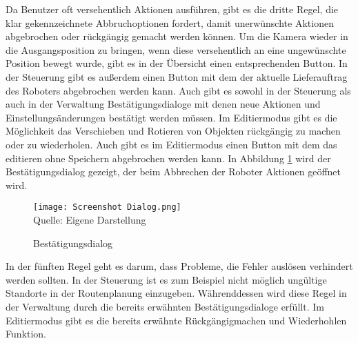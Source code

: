 Da Benutzer oft versehentlich Aktionen ausführen, gibt es die dritte Regel, die klar gekennzeichnete Abbruchoptionen fordert, damit unerwünschte Aktionen abgebrochen oder rückgängig gemacht werden können. Um die Kamera wieder in die Ausgangsposition zu bringen, wenn diese versehentlich an eine ungewünschte Position bewegt wurde, gibt es in der Übersicht einen entsprechenden Button. In der Steuerung gibt es außerdem einen Button mit dem der aktuelle Lieferauftrag des Roboters abgebrochen werden kann. Auch gibt es sowohl in der Steuerung als auch in der Verwaltung Bestätigungsdialoge mit denen neue Aktionen und Einstellungsänderungen bestätigt werden müssen. Im Editiermodus gibt es die Möglichkeit das Verschieben und Rotieren von Objekten rückgängig zu machen oder zu wiederholen. Auch gibt es im Editiermodus einen Button mit dem das editieren ohne Speichern abgebrochen werden kann. In Abbildung \ref{fig:DialogScreenshot} wird der Bestätigungsdialog gezeigt, der beim Abbrechen der Roboter Aktionen geöffnet wird.

\begin{figure}[H]
    \caption{Bestätigungsdialog}\label{fig:DialogScreenshot}
    \texttt{[image: Screenshot Dialog.png]}
    \\
    Quelle: Eigene Darstellung
\end{figure}


In der fünften Regel geht es darum, dass Probleme, die Fehler auslösen verhindert werden sollten. In der Steuerung ist es zum Beispiel nicht möglich ungültige Standorte in der Routenplanung einzugeben. Währenddessen wird diese Regel in der Verwaltung durch die bereits erwähnten Bestätigungsdialoge erfüllt. Im Editiermodus gibt es die bereits erwähnte Rückgängigmachen und Wiederhohlen Funktion.

